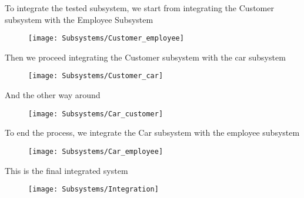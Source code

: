 To integrate the tested subsystem, we start from integrating the Customer subsystem with the Employee Subsystem

\begin{figure}[H]
\centering
\texttt{[image: Subsystems/Customer\_employee]}
\end{figure}

Then we proceed integrating the Customer subsystem with the car subsystem
\begin{figure}[H]
\centering
\texttt{[image: Subsystems/Customer\_car]}
\end{figure}

And the other way around
\begin{figure}[H]
\centering
\texttt{[image: Subsystems/Car\_customer]}
\end{figure}

To end the process, we integrate the Car subsystem with the employee subsystem
\begin{figure}[H]
\centering
\texttt{[image: Subsystems/Car\_employee]}
\end{figure}

This is the final integrated system
\begin{figure}[H]
\centering
\texttt{[image: Subsystems/Integration]}
\end{figure}
